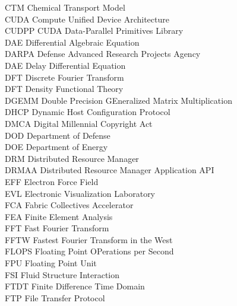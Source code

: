 \begin{tabbing}
CTM     \> Chemical Transport Model\\
CUDA    \> Compute Unified Device Architecture\\
CUDPP   \> CUDA Data-Parallel Primitives Library\\
DAE     \> Differential Algebraic Equation\\
DARPA   \> Defense Advanced Research Projects Agency\\
DAE     \> Delay Differential Equation\\
DFT     \> Discrete Fourier Transform\\
DFT     \> Density Functional Theory\\
DGEMM   \> Double Precision GEneralized Matrix Multiplication\\
DHCP    \> Dynamic Host Configuration Protocol\\
DMCA    \> Digital Millennial Copyright Act\\
DOD     \> Department of Defense\\
DOE     \> Department of Energy\\
DRM     \> Distributed Resource Manager\\
DRMAA   \> Distributed Resource Manager  Application API\\
EFF     \> Electron Force Field\\
EVL     \> Electronic Visualization Laboratory\\
FCA     \> Fabric Collectives Accelerator\\
FEA     \> Finite Element Analysis\\
FFT     \> Fast Fourier Transform\\
FFTW    \> Fastest Fourier Transform in the West\\
FLOPS   \> Floating Point OPerations per Second\\
FPU     \> Floating Point Unit\\
FSI     \> Fluid Structure Interaction\\
FTDT    \> Finite Difference Time Domain\\
FTP     \> File Transfer Protocol
\end{tabbing}

